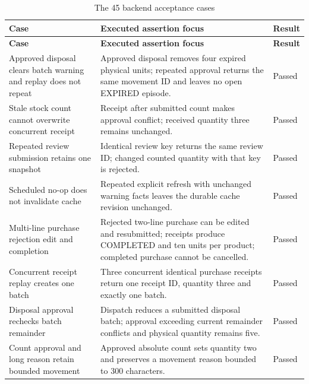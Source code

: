 \begin{longtable}{>{\raggedright\arraybackslash}p{}>{\raggedright\arraybackslash}p{}>{\raggedright\arraybackslash}p{}}
\caption{The 45 backend acceptance cases}\label{tab:acceptance-catalog}\\
\toprule
\textbf{Case} & \textbf{Executed assertion focus} & \textbf{Result} \\
\midrule\endfirsthead
\toprule
\textbf{Case} & \textbf{Executed assertion focus} & \textbf{Result} \\
\midrule\endhead
\bottomrule\endfoot
\leavevmode{}Approved disposal clears batch warning and replay does not repeat & \leavevmode{}Approved disposal removes four expired physical units; repeated approval returns the same movement ID and leaves no open EXPIRED episode. & \leavevmode{}Passed \\
\leavevmode{}Stale stock count cannot overwrite concurrent receipt & \leavevmode{}Receipt after submitted count makes approval conflict; received quantity three remains unchanged. & \leavevmode{}Passed \\
\leavevmode{}Repeated review submission retains one snapshot & \leavevmode{}Identical review key returns the same review ID; changed counted quantity with that key is rejected. & \leavevmode{}Passed \\
\leavevmode{}Scheduled no-op does not invalidate cache & \leavevmode{}Repeated explicit refresh with unchanged warning facts leaves the durable cache revision unchanged. & \leavevmode{}Passed \\
\leavevmode{}Multi-line purchase rejection edit and completion & \leavevmode{}Rejected two-line purchase can be edited and resubmitted; receipts produce COMPLETED and ten units per product; completed purchase cannot be cancelled. & \leavevmode{}Passed \\
\leavevmode{}Concurrent receipt replay creates one batch & \leavevmode{}Three concurrent identical purchase receipts return one receipt ID, quantity three and exactly one batch. & \leavevmode{}Passed \\
\leavevmode{}Disposal approval rechecks batch remainder & \leavevmode{}Dispatch reduces a submitted disposal batch; approval exceeding current remainder conflicts and physical quantity remains five. & \leavevmode{}Passed \\
\leavevmode{}Count approval and long reason retain bounded movement & \leavevmode{}Approved absolute count sets quantity two and preserves a movement reason bounded to 300 characters. & \leavevmode{}Passed \\

\end{longtable}

